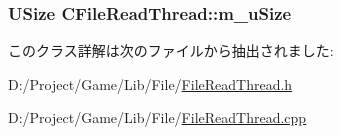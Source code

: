 \subsubsection[{m\+\_\+u\+Size}]{\setlength{\rightskip}{0pt plus 5cm}U\+Size C\+File\+Read\+Thread\+::m\+\_\+u\+Size\hspace{0.3cm}{\ttfamily [private]}}\label{class_c_file_read_thread_afcc49a43972a0ccb2f59a498678e6f14}


このクラス詳解は次のファイルから抽出されました\+:\begin{DoxyCompactItemize}
\item 
D\+:/\+Project/\+Game/\+Lib/\+File/\hyperlink{_file_read_thread_8h}{File\+Read\+Thread.\+h}\item 
D\+:/\+Project/\+Game/\+Lib/\+File/\hyperlink{_file_read_thread_8cpp}{File\+Read\+Thread.\+cpp}\end{DoxyCompactItemize}
